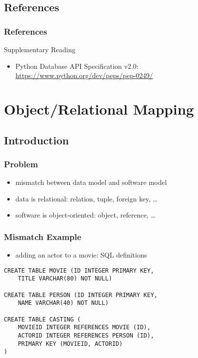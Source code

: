 \documentclass[dvipsnames]{beamer}
\theoremstyle{plain}
\begin{document}
\subsection*{References}

\begin{frame}
  \frametitle{References}

  \begin{block}{Supplementary Reading}
    \begin{itemize}
    \item Python Database API Specification v2.0:\\
      \url{https://www.python.org/dev/peps/pep-0249/}
    \end{itemize}
  \end{block}
\end{frame}

\section{Object/Relational Mapping}

\subsection{Introduction}

\begin{frame}
  \frametitle{Problem}

  \begin{itemize}
    \item mismatch between data model and software model

    \medskip
    \item data is relational: relation, tuple, foreign key, \ldots
    \item software is object-oriented: object, reference, \ldots
  \end{itemize}
\end{frame}

\begin{frame}[fragile]
  \frametitle{Mismatch Example}

  \begin{itemize}
    \item adding an actor to a movie: SQL definitions
  \end{itemize}

  \begin{lstlisting}[language=FullSQL]
CREATE TABLE MOVIE (ID INTEGER PRIMARY KEY,
    TITLE VARCHAR(80) NOT NULL)

CREATE TABLE PERSON (ID INTEGER PRIMARY KEY,
    NAME VARCHAR(40) NOT NULL)

CREATE TABLE CASTING (
    MOVIEID INTEGER REFERENCES MOVIE (ID),
    ACTORID INTEGER REFERENCES PERSON (ID),
    PRIMARY KEY (MOVIEID, ACTORID)
)
  \end{lstlisting}
\end{frame}
\end{document}
